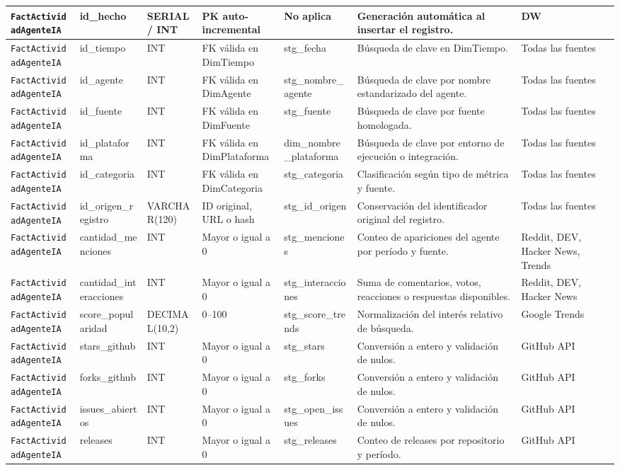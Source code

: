 \documentclass[12pt,a4paper]{article}
\newcommand{\FactTabla}{\texttt{FactActividadAgenteIA}}
\begin{document}
\begin{landscape}
\begin{longtable}{|P{3.55cm}|P{3.05cm}|P{2.35cm}|P{4.00cm}|P{3.95cm}|P{4.95cm}|P{3.05cm}|}
\FactTabla & id\_hecho & SERIAL / INT & PK auto-incremental & No aplica & Generación automática al insertar el registro. & DW \\ \hline
\FactTabla & id\_tiempo & INT & FK válida en DimTiempo & stg\_fecha & Búsqueda de clave en DimTiempo. & Todas las fuentes \\ \hline
\FactTabla & id\_agente & INT & FK válida en DimAgente & stg\_nombre\_agente & Búsqueda de clave por nombre estandarizado del agente. & Todas las fuentes \\ \hline
\FactTabla & id\_fuente & INT & FK válida en DimFuente & stg\_fuente & Búsqueda de clave por fuente homologada. & Todas las fuentes \\ \hline
\FactTabla & id\_plataforma & INT & FK válida en DimPlataforma & dim\_nombre\_plataforma & Búsqueda de clave por entorno de ejecución o integración. & Todas las fuentes \\ \hline
\FactTabla & id\_categoria & INT & FK válida en DimCategoria & stg\_categoria & Clasificación según tipo de métrica y fuente. & Todas las fuentes \\ \hline
\FactTabla & id\_origen\_registro & VARCHAR(120) & ID original, URL o hash & stg\_id\_origen & Conservación del identificador original del registro. & Todas las fuentes \\ \hline
\FactTabla & cantidad\_menciones & INT & Mayor o igual a 0 & stg\_menciones & Conteo de apariciones del agente por período y fuente. & Reddit, DEV, Hacker News, Trends \\ \hline
\FactTabla & cantidad\_interacciones & INT & Mayor o igual a 0 & stg\_interacciones & Suma de comentarios, votos, reacciones o respuestas disponibles. & Reddit, DEV, Hacker News \\ \hline
\FactTabla & score\_popularidad & DECIMAL(10,2) & 0--100 & stg\_score\_trends & Normalización del interés relativo de búsqueda. & Google Trends \\ \hline
\FactTabla & stars\_github & INT & Mayor o igual a 0 & stg\_stars & Conversión a entero y validación de nulos. & GitHub API \\ \hline
\FactTabla & forks\_github & INT & Mayor o igual a 0 & stg\_forks & Conversión a entero y validación de nulos. & GitHub API \\ \hline
\FactTabla & issues\_abiertos & INT & Mayor o igual a 0 & stg\_open\_issues & Conversión a entero y validación de nulos. & GitHub API \\ \hline
\FactTabla & releases & INT & Mayor o igual a 0 & stg\_releases & Conteo de releases por repositorio y período. & GitHub API \\ \hline

\end{longtable}
\end{landscape}
\end{document}
